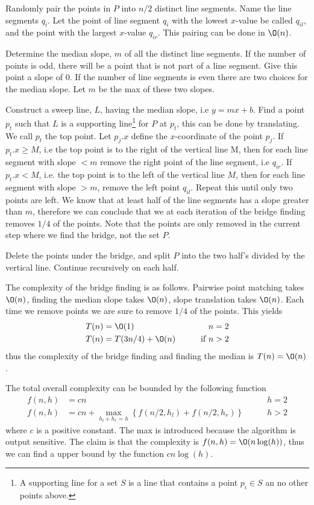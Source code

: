 \documentclass[10pt]{article}
\begin{document}
Randomly pair the points in $P$ into $n/2$ distinct line segments. Name the line segments $q_i$. Let the point of line segment $q_i$ with the lowest $x$-value be called $q_{il}$, and the point with the largest $x$-value $q_{ir}$. This pairing can be done in $\O(n)$.

Determine the median slope, $m$ of all the distinct line segments. If the number of points is odd, there will be a point that is not part of a line segment. Give this point a slope of $0$. If the number of line segments is even there are two choices for the median slope. Let $m$ be the max of these two slopes.

Construct a sweep line, $L$, having the median slope, i.e $y = mx+b$. Find a point $p_t$ such that $L$ is a supporting line\footnote{A supporting line for a set $S$ is a line that contains a point $p_i \in S$ an no other points above.} for $P$ at $p_t$, this can be done by translating. We call $p_t$ the top point. Let $p_j.x$ define the $x$-coordinate of the point $p_j$. If $p_t.x \geq M$, i.e the top point is to the right of the vertical line M, then for each line segment with slope $< m$ remove the right point of the line segment, i.e $q_{ir}$. If $p_t.x < M$, i.e. the top point is to the left of the vertical line $M$, then for each line segment with slope $>m$, remove the left point $q_{il}$. Repeat this until only two points are left. We know that at least half of the line segments has a slope greater than $m$, therefore we can conclude that we at each iteration of the bridge finding removes $1/4$ of the points. Note that the points are only removed in the current step where we find the bridge, not the set $P$.

Delete the points under the bridge, and split $P$ into the two half's divided by the vertical line. Continue recursively on each half.

The complexity of the bridge finding is as follows. Pairwise point matching takes $\O(n)$, finding the median slope takes $\O(n)$, slope translation takes $\O(n)$. Each time we remove points we are sure to remove $1/4$ of the points. This yields 
\begin{align*}
T(n) &= \O(1) &\qquad n=2\\ 
T(n) &= T(3n/4) + \O(n) &\qquad \text{if } n>2
\end{align*}
thus the complexity of the bridge finding and finding the median is $T(n)=\O(n)$.

The total overall complexity can be bounded by the following function
\begin{align*}
f(n,h) &= cn &\qquad h=2  \\ 
f(n,h) &= cn + \max_{h_l+h_r = h}\left\{f(n/2,h_l)+f(n/2,h_r)\right\} &\qquad h>2
\end{align*}
where $c$ is a positive constant. The max is introduced because the algorithm is output sensitive. The claim is that the complexity is $f(n,h) = \O(n\log(h))$, thus we can find a upper bound by the function $cn\log(h)$.
\end{document}
